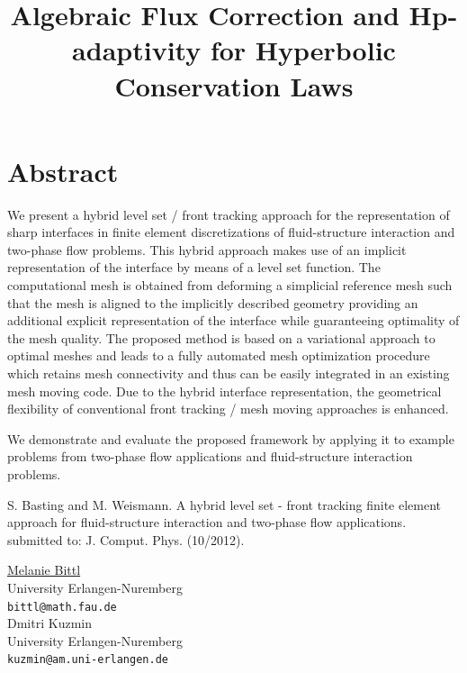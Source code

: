 \documentclass[article, A4, 11pt]{llncs}%
\begin{document}
\section*{Abstract}
We present a hybrid level set / front tracking approach for the representation of sharp interfaces in finite element discretizations of fluid-structure interaction and two-phase flow problems. This hybrid approach makes use of an implicit representation of the interface by means of a level set function. The computational mesh is obtained from deforming a simplicial reference mesh such that the mesh is aligned to the implicitly described geometry providing an additional explicit representation of the interface while guaranteeing optimality of the mesh quality. The proposed method is based on a variational approach to optimal meshes and leads to a fully automated mesh optimization procedure which retains mesh connectivity and thus can be easily integrated in an existing mesh moving code. Due to the hybrid interface representation, the geometrical flexibility of conventional front tracking / mesh moving approaches is enhanced.

  We demonstrate and evaluate the proposed framework by applying it to example problems from two-phase flow applications and fluid-structure interaction problems.



\begin{thebibliography}{10}
{\sc S. Basting and M. Weismann}. {A hybrid level set - front tracking finite element approach for fluid-structure interaction and two-phase flow applications}. submitted to: J. Comput. Phys. (10/2012).
\end{thebibliography} %

\title{Algebraic Flux Correction and Hp-adaptivity for Hyperbolic Conservation Laws}
 \author{} \institute{}
\maketitle
\begin{center}
{\large \underline{Melanie Bittl}}\\
University Erlangen-Nuremberg\\
{\tt bittl@math.fau.de}
\\ \vspace{4mm}
{\large Dmitri Kuzmin}\\
University Erlangen-Nuremberg\\
{\tt kuzmin@am.uni-erlangen.de}
\end{center}
\end{document}
